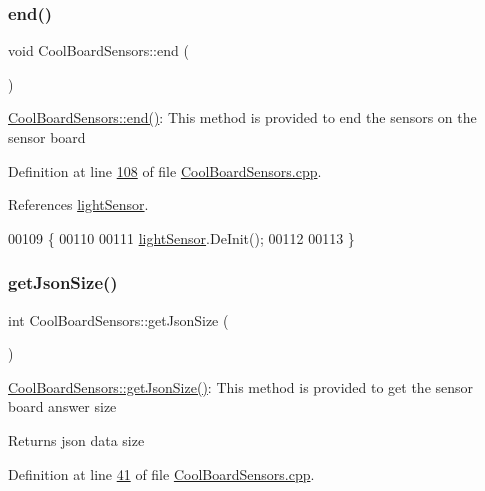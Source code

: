 \subsubsection{\texorpdfstring{end()}{end()}}
{\footnotesize\ttfamily void Cool\+Board\+Sensors\+::end (\begin{DoxyParamCaption}{ }\end{DoxyParamCaption})}

\hyperlink{class_cool_board_sensors_a4902b69f6e628bd6557193758fdd2bae}{Cool\+Board\+Sensors\+::end()}\+: This method is provided to end the sensors on the sensor board 

Definition at line \hyperlink{_cool_board_sensors_8cpp_source_l00108}{108} of file \hyperlink{_cool_board_sensors_8cpp_source}{Cool\+Board\+Sensors.\+cpp}.



References \hyperlink{_cool_board_sensors_8h_source_l00075}{light\+Sensor}.


\begin{DoxyCode}
00109 \{
00110 
00111     \hyperlink{class_cool_board_sensors_a3e397300fb707dd193e909a757bf6102}{lightSensor}.DeInit();
00112 
00113 \}
\end{DoxyCode}
\mbox{\label{class_cool_board_sensors_ab82c2a1633768ccd12a589320fa31a14}} 
\subsubsection{\texorpdfstring{get\+Json\+Size()}{getJsonSize()}}
{\footnotesize\ttfamily int Cool\+Board\+Sensors\+::get\+Json\+Size (\begin{DoxyParamCaption}{ }\end{DoxyParamCaption})}

\hyperlink{class_cool_board_sensors_ab82c2a1633768ccd12a589320fa31a14}{Cool\+Board\+Sensors\+::get\+Json\+Size()}\+: This method is provided to get the sensor board answer size

\begin{DoxyReturn}{Returns}
json data size 
\end{DoxyReturn}


Definition at line \hyperlink{_cool_board_sensors_8cpp_source_l00041}{41} of file \hyperlink{_cool_board_sensors_8cpp_source}{Cool\+Board\+Sensors.\+cpp}.


